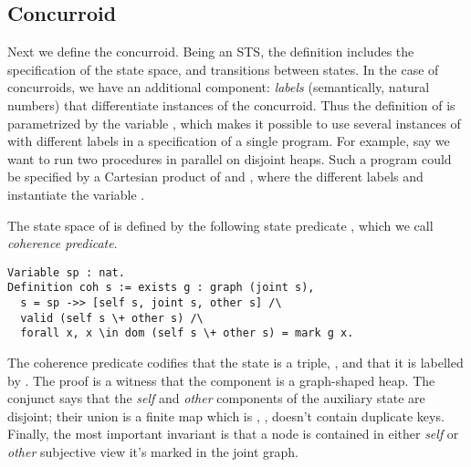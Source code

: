 \subsection{ Concurroid}
\label{sec:graph-conc-coher}

Next we define the  concurroid. Being an STS, the
definition includes the specification of the state space, and
transitions between states. In the case of concurroids, we have an
additional component: \emph{labels} (semantically, natural numbers)
that differentiate instances of the concurroid. Thus the
definition of  is parametrized by the variable
, which makes it possible to use several instances of
 with different labels in a specification of a single
program. For example, say we want to run two  procedures
in parallel on disjoint heaps. Such a program could be specified by a
Cartesian product of  and ,
where the different labels  and  instantiate the
variable .

The state space of  is defined by the following state
predicate , which we call \emph{coherence predicate}.

%
%
%
\begin{lstlisting}
Variable sp : nat.
Definition coh s := exists g : graph (joint s), 
  s = sp ->> [self s, joint s, other s] /\ 
  valid (self s \+ other s) /\ 
  forall x, x \in dom (self s \+ other s) = mark g x.  
\end{lstlisting}
%
The coherence predicate codifies that the state  is a triple,
\code{[self s,}  \code{other s]}, and that it is
labelled by \code{sp}. The proof \code{g} is a witness that the
\code{joint} component is a graph-shaped heap.
%
The conjunct  says that the
\emph{self} and \emph{other} components of the auxiliary state are
disjoint; their union is a finite map which is \code{valid}, \ie,
doesn't contain duplicate keys.
%
Finally, the most important invariant is that a node  is
contained in either \emph{self} or \emph{other} subjective view \Iff
it's marked in the joint graph.
%

